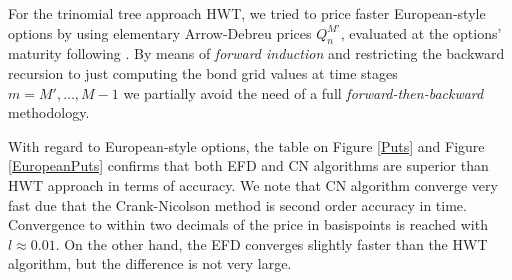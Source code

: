 For the trinomial tree approach HWT, we tried to price faster
European-style options by using elementary Arrow-Debreu prices 
$Q^{M'}_n$, evaluated at the options' maturity following
\cite[Sect. 2.2.4, pp. 22--23]{N:2003}. By means of {\sl forward
  induction} and restricting the backward recursion to just computing
the bond grid values at time stages $ m = M' , \dots, M-1$ we
partially avoid the need of a full {\sl forward-then-backward} methodology. 

With regard to European-style options, the table on Figure
\ref{Puts} and Figure \ref{EuropeanPuts} confirms that both EFD and CN
algorithms are superior than HWT approach in terms of accuracy. We
note that CN algorithm converge very 
fast due that the Crank-Nicolson method is second order accuracy in
time. Convergence to within two decimals of the price in basispoints
is reached with $l\approx 0.01$. On the other hand, the EFD converges 
slightly faster than the HWT algorithm, but the difference is not very
large. 

